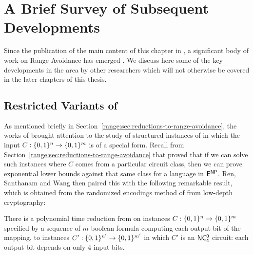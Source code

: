 \section{A Brief Survey of Subsequent Developments}\label{range:sec:subsequent-developments}
Since the publication of the main content of this chapter in \cite{Korten}, a significant body of work on Range Avoidance has emerged \cite{RSW,low-depth-avoid,time-space,hard-partial,ILW,CHR,Li,CL24,karthik,CGLOSS23,KP24,vyas-williams,KortenSanthanam25,FIM25,KPI25,KuntewarSarma25,Ilango25ODH,GLS25,HirschVolkovich25AvoidMCSP,HirschVolkovich26LOP,GLY26,GGLS26,HLZ26,RWZ26,GFIM26}. We discuss here some of the key developments in the area by other researchers which will not otherwise be covered in the later chapters of this thesis.

\subsection{Restricted Variants of \avoid}
As mentioned briefly in Section~\ref{range:sec:reductions-to-range-avoidance}, the works of \cite{RSW,guruswami2022range} brought attention to the study of structured instances of \avoid in which the input $C: \{0,1\}^n \to \{0,1\}^m$ is of a special form. Recall from Section~\ref{range:sec:reductions-to-range-avoidance} that \cite{RSW} proved that if we can solve such instances where $C$ comes from a particular circuit class, then we can prove exponential lower bounds against that same class for a language in $\cl{E^{NP}}$. Ren, Santhanam and Wang \cite{RSW} then paired this with the following remarkable result, which is obtained from the randomized encodings method of \cite{randomized-encodings} from low-depth cryptography:
\begin{theorem}\label{thm:depth-reduction}
There is a polynomial time reduction from \avoid on instances $C: \{0,1\}^n \to \{0,1\}^m$ specified by a sequence of $m$ boolean formula computing each output bit of the mapping, to instances $C': \{0,1\}^{n'} \to \{0,1\}^{m'}$ in which $C'$ is an $\cl{NC^0_4}$ circuit: each output bit depends on only 4 input bits.   
\end{theorem}
